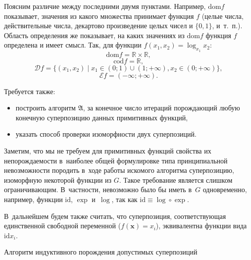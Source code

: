 \documentclass[12pt,a4paper]{article}
\makeatletter
\renewcommand{\section}{\@startsection {section}{1}
  \z@{2.7ex \@plus 1ex}{1.0ex}%
  {\normalfont}}
\makeatother
\begin{document}
Поясним различие между последними двумя пунктами. Например, $\text{dom} f$
показывает, значения из какого множества принимает функция $f$ (целые числа,
действительные числа, декартово произведение целых чисел и $\{0, 1\}$,
и~т.~п.). Область определения же показывает, на каких значениях из
$\text{dom} f$ функция $f$ определена и имеет смысл. Так, для функции
$f(x_1, x_2) = \log_{x_1} x_2$:
\[
  \text{dom} f = \mathbb{R} \times \mathbb{R},
\]
\[
  \text{cod} f = \mathbb{R},
\]
\[
  \mathcal{D} f = \{ (x_1, x_2) \mid x_1 \in (0; 1) \cup (1; +\infty), x_2 \in (0; +\infty) \},
\]
\[
  \mathcal{E} f = (-\infty; +\infty).
\]

Требуется также:
\begin{itemize}
  \item построить алгоритм $\mathfrak{A}$, за конечное число итераций
	порождающий любую конечную суперпозицию данных примитивных функций,
  \item указать способ проверки изоморфности двух суперпозиций.
\end{itemize}

Заметим, что мы не требуем для примитивных функций свойства их непорождаемости
в~наиболее общей формулировке типа принципиальной невозможности породить
в~ходе работы искомого алгоритма суперпозицию, изоморфную некоторой функции из
$G$. Такое требование является слишком ограничивающим. В~частности, невозможно
было бы иметь в~$G$ одновременно, например, функции $\text{id}$, $\exp$
и~$\log$, так как $\text{id} \equiv \log \circ \exp$.

В~дальнейшем будем также считать, что суперпозиция, соответствующая
единственной свободной переменной ($f(\mathbf{x}) = x_i$), эквивалентна
функции вида $\text{id} x_i$.

\section{Алгоритм индуктивного порождения допустимых суперпозиций}
\end{document}
